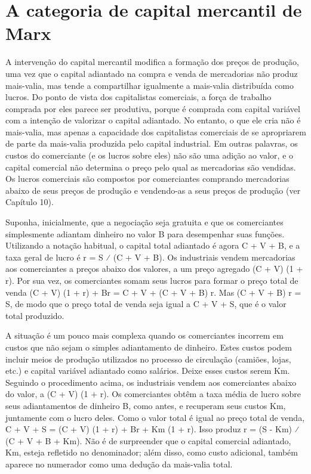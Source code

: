 \section{A categoria de capital mercantil de Marx}
 \par 
A intervenção do capital mercantil modifica a formação dos preços de produção, uma vez que o capital adiantado na compra e venda de mercadorias não produz mais-valia, mas tende a compartilhar igualmente a mais-valia distribuída como lucros. Do ponto de vista dos capitalistas comerciais, a força de trabalho comprada por eles parece ser produtiva, porque é comprada com capital variável com a intenção de valorizar o capital adiantado. No entanto, o que ele cria não é mais-valia, mas apenas a capacidade dos capitalistas comerciais de se apropriarem de parte da mais-valia produzida pelo capital industrial. Em outras palavras, os custos do comerciante (e os lucros sobre eles) não são uma adição ao valor, e o capital comercial não determina o preço pelo qual as mercadorias são vendidas. Os lucros comerciais são compostos por comerciantes comprando mercadorias abaixo de seus preços de produção e vendendo-as a seus preços de produção (ver Capítulo {\color{blue}10}).
 \par 
Suponha, inicialmente, que a negociação seja gratuita e que os comerciantes simplesmente adiantam dinheiro no valor B para desempenhar suas funções. Utilizando a notação habitual, o capital total adiantado é agora C + V + B, e a taxa geral de lucro é r = S ⁄ (C + V + B). Os industriais vendem mercadorias aos comerciantes a preços abaixo dos valores, a um preço agregado (C + V) (1 + r). Por sua vez, os comerciantes somam seus lucros para formar o preço total de venda (C + V) (1 + r) + Br = C + V + (C + V + B) r. Mas (C + V + B) r = S, de modo que o preço total de venda seja igual a C + V + S, que é o valor total produzido.
 \par 
A situação é um pouco mais complexa quando os comerciantes incorrem em custos que não sejam o simples adiantamento de dinheiro. Estes custos podem incluir meios de produção utilizados no processo de circulação (camiões, lojas, etc.) e capital variável adiantado como salários. Deixe esses custos serem Km. Seguindo o procedimento acima, os industriais vendem aos comerciantes abaixo do valor, a (C + V) (1 + r). Os comerciantes obtêm a taxa média de lucro sobre seus adiantamentos de dinheiro B, como antes, e recuperam seus custos Km, juntamente com o lucro deles. Como o valor total é igual ao preço total de venda, C + V + S = (C + V) (1 + r) + Br + Km (1 + r). Isso produz r = (S - Km) ⁄ (C + V + B + Km). Não é de surpreender que o capital comercial adiantado, Km, esteja refletido no denominador; além disso, como custo adicional, também aparece no numerador como uma dedução da mais-valia total.
 \par 
